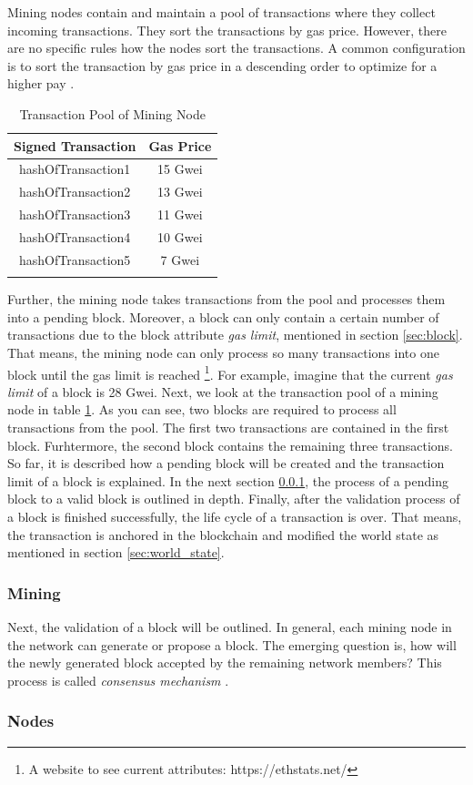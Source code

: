 Mining nodes contain and maintain a pool of transactions where they collect incoming transactions. They sort the transactions by gas price. However, there are no specific rules how the nodes sort the transactions. A common configuration is to sort the transaction by gas price in a descending order to optimize for a higher pay .

\begin{longtable}{c|c}
	\hline
	\hline
	Signed Transaction & Gas Price \\
	\hline
	hashOfTransaction1 & 15 Gwei \\
	hashOfTransaction2 & 13 Gwei \\
	hashOfTransaction3 & 11 Gwei \\
	hashOfTransaction4 & 10 Gwei \\
	hashOfTransaction5 & 7 Gwei \\
	\hline
	\hline
	\caption{Transaction Pool of Mining Node}
	\label{table:sorted_gas_prices}
\end{longtable} 

Further, the mining node takes transactions from the pool and processes them into a pending block. Moreover, a block can only contain a certain number of transactions due to the block attribute \textit{gas limit}, mentioned in section \ref{sec:block}. That means, the mining node can only process so many transactions into one block until the gas limit is reached \footnote{A website to see current attributes: https://ethstats.net/}. For example, imagine that the current \textit{gas limit} of a block is 28 Gwei. Next, we look at the transaction pool of a mining node in table \ref{table:sorted_gas_prices}. As you can see, two blocks are required to process all transactions from the pool. The first two transactions are contained in the first block. Furhtermore, the second block contains the remaining three transactions. 
So far, it is described how a pending block will be created and the transaction limit of a block is explained. In the next section \ref{sec:mining}, the process of a pending block to a valid block is outlined in depth. Finally, after the validation process of a block is finished successfully, the life cycle of a transaction is over. That means, the transaction is anchored in the blockchain and modified the world state as mentioned in section \ref{sec:world_state}.

\subsubsection{Mining}
\label{sec:mining}
Next, the validation of a block will be outlined. In general, each mining node in the network can generate or propose a block. The emerging question is, how will the newly generated block accepted by the remaining network members? This process is called \textit{consensus mechanism} . 

\subsubsection{Nodes}
\label{sec:nodes}


\clearpage

